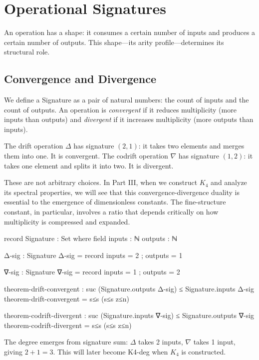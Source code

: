 \documentclass[11pt,a4paper]{book}
\def\texttt#1{#1}%
\begin{document}
\chapter{Operational Signatures}

An operation has a shape: it consumes a certain number of inputs and produces a 
certain number of outputs. This shape—its arity profile—determines its structural 
role.

\section{Convergence and Divergence}

We define a \texttt{Signature} as a pair of natural numbers: the count of inputs 
and the count of outputs. An operation is \emph{convergent} if it reduces multiplicity 
(more inputs than outputs) and \emph{divergent} if it increases multiplicity (more 
outputs than inputs).

The drift operation $\Delta$ has signature $(2,1)$: it takes two elements and merges 
them into one. It is convergent. The codrift operation $\nabla$ has signature $(1,2)$: 
it takes one element and splits it into two. It is divergent.

These are not arbitrary choices. In Part III, when we construct $K_4$ and analyze 
its spectral properties, we will see that this convergence-divergence duality is 
essential to the emergence of dimensionless constants. The fine-structure constant, 
in particular, involves a ratio that depends critically on how multiplicity is 
compressed and expanded.

\begin{code}
record Signature : Set where
  field
    inputs  : ℕ
    outputs : ℕ
\end{code}

\begin{code}
Δ-sig : Signature
Δ-sig = record { inputs = 2 ; outputs = 1 }

∇-sig : Signature
∇-sig = record { inputs = 1 ; outputs = 2 }

theorem-drift-convergent : suc (Signature.outputs Δ-sig) ≤ Signature.inputs Δ-sig
theorem-drift-convergent = s≤s (s≤s z≤n)

theorem-codrift-divergent : suc (Signature.inputs ∇-sig) ≤ Signature.outputs ∇-sig
theorem-codrift-divergent = s≤s (s≤s z≤n)
\end{code}

The degree emerges from signature sum: $\Delta$ takes 2 inputs, $\nabla$ takes 1 input, giving $2+1=3$.
This will later become \texttt{K4-deg} when $K_4$ is constructed.
\end{document}
